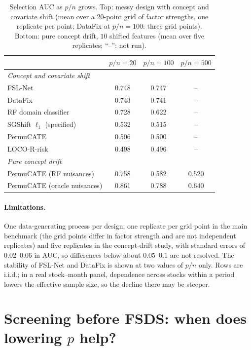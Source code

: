 \begin{table}[h]
\centering
\caption{Selection AUC as $p/n$ grows. Top: messy design with concept and covariate shift (mean over a 20-point grid of factor strengths, one replicate per point; DataFix at $p/n=100$: three grid points). Bottom: pure concept drift, $10$ shifted features (mean over five replicates; ``--'': not run).}
\label{tab:uhd_decline}
\begin{tabular}{lccc}
\toprule
 & $p/n=20$ & $p/n=100$ & $p/n=500$ \\
\midrule
\multicolumn{4}{l}{\emph{Concept and covariate shift}} \\
FSL-Net                         & 0.748 & 0.747 & -- \\
DataFix                         & 0.743 & 0.741 & -- \\
RF domain classifier            & 0.728 & 0.622 & -- \\
SGShift $\ell_1$ (specified)    & 0.532 & 0.515 & -- \\
PermuCATE                       & 0.506 & 0.500 & -- \\
LOCO-R-risk                     & 0.498 & 0.496 & -- \\
\midrule
\multicolumn{4}{l}{\emph{Pure concept drift}} \\
PermuCATE (RF nuisances)        & 0.758 & 0.582 & 0.520 \\
PermuCATE (oracle nuisances)    & 0.861 & 0.788 & 0.640 \\
\bottomrule
\end{tabular}
\end{table}

\paragraph{Limitations.}
One data-generating process per design; one replicate per grid point in the main benchmark (the grid points differ in factor strength and are not independent replicates) and five replicates in the concept-drift study, with standard errors of $0.02$--$0.06$ in AUC, so differences below about $0.05$--$0.1$ are not resolved. The stability of FSL-Net and DataFix is shown at two values of $p/n$ only. Rows are i.i.d.; in a real stock--month panel, dependence across stocks within a period lowers the effective sample size, so the decline there may be steeper.

\section{Screening before FSDS: when does lowering $p$ help?}
\label{app:screening}

